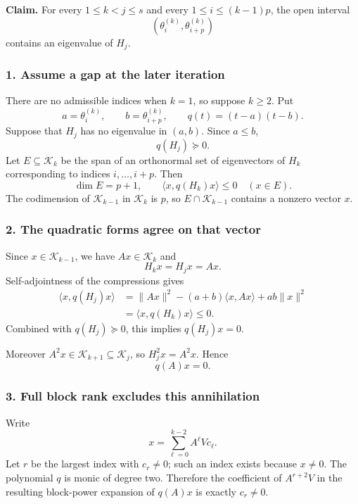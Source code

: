 \documentclass[10pt,a4paper]{article}
\begin{document}
\textbf{Claim.} For every \(1\le k<j\le s\) and every
\(1\le i\le(k-1)p\), the open interval \[
(\theta_i^{(k)},\theta_{i+p}^{(k)})
\] contains an eigenvalue of \(H_j\).

\subsubsection{1. Assume a gap at the later
iteration}\label{assume-a-gap-at-the-later-iteration}

There are no admissible indices when \(k=1\), so suppose \(k\ge2\). Put
\[
a=\theta_i^{(k)},\qquad b=\theta_{i+p}^{(k)},\qquad
q(t)=(t-a)(t-b).
\] Suppose that \(H_j\) has no eigenvalue in \((a,b)\). Since
\(a\le b\), \[
q(H_j)\succeq0.
\] Let \(E\subseteq\mathcal K_k\) be the span of an orthonormal set of
eigenvectors of \(H_k\) corresponding to indices \(i,\ldots,i+p\). Then
\[
\dim E=p+1,\qquad \langle x,q(H_k)x\rangle\le0\quad(x\in E).
\] The codimension of \(\mathcal K_{k-1}\) in \(\mathcal K_k\) is \(p\),
so \(E\cap\mathcal K_{k-1}\) contains a nonzero vector \(x\).

\subsubsection{2. The quadratic forms agree on that
vector}\label{the-quadratic-forms-agree-on-that-vector}

Since \(x\in\mathcal K_{k-1}\), we have \(Ax\in\mathcal K_k\) and \[
H_kx=H_jx=Ax.
\] Self-adjointness of the compressions gives \[
\begin{aligned}
\langle x,q(H_j)x\rangle
&=\|Ax\|^2-(a+b)\langle x,Ax\rangle+ab\|x\|^2\\
&=\langle x,q(H_k)x\rangle\le0.
\end{aligned}
\] Combined with \(q(H_j)\succeq0\), this implies \(q(H_j)x=0\).

Moreover \(A^2x\in\mathcal K_{k+1}\subseteq\mathcal K_j\), so
\(H_j^2x=A^2x\). Hence \[
q(A)x=0.
\]

\subsubsection{3. Full block rank excludes this
annihilation}\label{full-block-rank-excludes-this-annihilation}

Write \[
x=\sum_{\ell=0}^{k-2}A^\ell Vc_\ell.
\] Let \(r\) be the largest index with \(c_r\ne0\); such an index exists
because \(x\ne0\). The polynomial \(q\) is monic of degree two.
Therefore the coefficient of \(A^{r+2}V\) in the resulting block-power
expansion of \(q(A)x\) is exactly \(c_r\ne0\).
\end{document}
